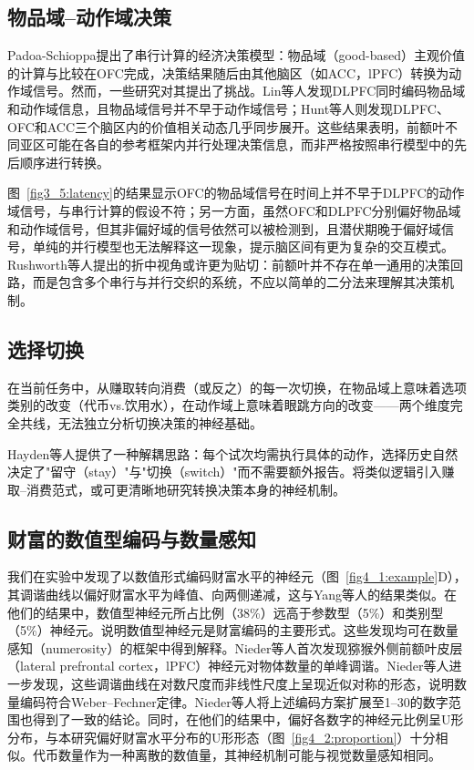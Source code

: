 \subsection{物品域–动作域决策}\label{chap4_2_2:serial_parallel}

Padoa-Schioppa\citep{padoaschioppa2011neurobiology}提出了串行计算的经济决策模型：物品域（good-based）主观价值的计算与比较在OFC完成，决策结果随后由其他脑区（如ACC，lPFC）转换为动作域信号。然而，一些研究对其提出了挑战。Lin等人\citep{lin2020evidence}发现DLPFC同时编码物品域和动作域信息，且物品域信号并不早于动作域信号；Hunt等人\citep{hunt2015capturing}则发现DLPFC、OFC和ACC三个脑区内的价值相关动态几乎同步展开。这些结果表明，前额叶不同亚区可能在各自的参考框架内并行处理决策信息，而非严格按照串行模型中的先后顺序进行转换。

图~\ref{fig3_5:latency}的结果显示OFC的物品域信号在时间上并不早于DLPFC的动作域信号，与串行计算的假设不符；另一方面，虽然OFC和DLPFC分别偏好物品域和动作域信号，但其非偏好域的信号依然可以被检测到，且潜伏期晚于偏好域信号，单纯的并行模型也无法解释这一现象，提示脑区间有更为复杂的交互模式。Rushworth等人\citep{rushworth2012valuation}提出的折中视角或许更为贴切：前额叶并不存在单一通用的决策回路，而是包含多个串行与并行交织的系统，不应以简单的二分法来理解其决策机制。

\subsection{选择切换}\label{chap4_2_3_switch:switch}

在当前任务中，从赚取转向消费（或反之）的每一次切换，在物品域上意味着选项类别的改变（代币vs.饮用水），在动作域上意味着眼跳方向的改变——两个维度完全共线，无法独立分析切换决策的神经基础。

Hayden等人\citep{hayden2011neuronal}提供了一种解耦思路：每个试次均需执行具体的动作，选择历史自然决定了"留守（stay）"与"切换（switch）"而不需要额外报告。将类似逻辑引入赚取–消费范式，或可更清晰地研究转换决策本身的神经机制。

\subsection{财富的数值型编码与数量感知}\label{chap4_2_4:numerosity}

我们在实验中发现了以数值形式编码财富水平的神经元（图~\ref{fig4_1:example}D），其调谐曲线以偏好财富水平为峰值、向两侧递减，这与Yang等人\citep{yang2022primate}的结果类似。在他们的结果中，数值型神经元所占比例（38\%）远高于参数型（5\%）和类别型（5\%）神经元。说明数值型神经元是财富编码的主要形式。这些发现均可在数量感知（numerosity）的框架中得到解释。Nieder等人\citep{nieder2002representation}首次发现猕猴外侧前额叶皮层（lateral prefrontal cortex，lPFC）神经元对物体数量的单峰调谐。Nieder等人\citep{nieder2003coding}进一步发现，这些调谐曲线在对数尺度而非线性尺度上呈现近似对称的形态，说明数量编码符合Weber–Fechner定律。Nieder等人\citep{nieder2007code}将上述编码方案扩展至1–30的数字范围也得到了一致的结论。同时，在他们的结果中，偏好各数字的神经元比例呈U形分布，与本研究偏好财富水平分布的U形形态（图~\ref{fig4_2:proportion}）十分相似。代币数量作为一种离散的数值量，其神经机制可能与视觉数量感知相同。

